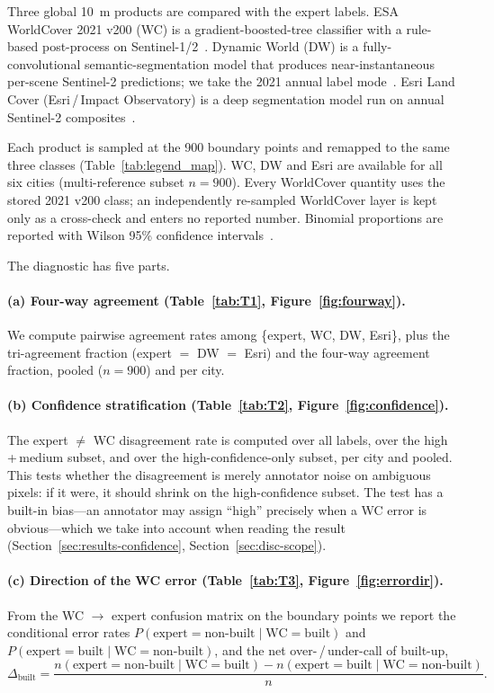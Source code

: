 Three global 10~m products are compared with the expert labels. ESA WorldCover
2021 v200 (WC) is a gradient-boosted-tree classifier with a rule-based
post-process on Sentinel-1/2~\citep{zanaga2022}. Dynamic World (DW) is a
fully-convolutional semantic-segmentation model that produces
near-instantaneous per-scene Sentinel-2 predictions; we take the 2021 annual
label mode~\citep{brown2022}. Esri Land Cover (Esri\,/\,Impact Observatory) is a
deep segmentation model run on annual Sentinel-2 composites~\citep{karra2021}.

Each product is sampled at the 900 boundary points and remapped to the same
three classes (Table~\ref{tab:legend_map}). WC, DW and Esri are available for
all six cities (multi-reference subset $n = 900$). Every WorldCover quantity
uses the stored 2021 v200 class; an independently re-sampled WorldCover layer is
kept only as a cross-check and enters no reported number. Binomial proportions
are reported with Wilson 95\% confidence intervals~\citep{wilson1927}.

The diagnostic has five parts.

\paragraph{(a) Four-way agreement (Table~\ref{tab:T1}, Figure~\ref{fig:fourway}).}
We compute pairwise agreement rates among \{expert, WC, DW, Esri\}, plus the
tri-agreement fraction (expert $=$ DW $=$ Esri) and the four-way agreement
fraction, pooled ($n = 900$) and per city.

\paragraph{(b) Confidence stratification (Table~\ref{tab:T2}, Figure~\ref{fig:confidence}).}
The expert $\neq$ WC disagreement rate is computed over all labels, over the
high\,+\,medium subset, and over the high-confidence-only subset, per city and
pooled. This tests whether the disagreement is merely annotator noise on
ambiguous pixels: if it were, it should shrink on the high-confidence subset.
The test has a built-in bias---an annotator may assign ``high'' precisely when a
WC error is obvious---which we take into account when reading the result
(Section~\ref{sec:results-confidence}, Section~\ref{sec:disc-scope}).

\paragraph{(c) Direction of the WC error (Table~\ref{tab:T3}, Figure~\ref{fig:errordir}).}
From the WC $\to$ expert confusion matrix on the boundary points we report the
conditional error rates $P(\text{expert} = \text{non-built} \mid \text{WC} =
\text{built})$ and $P(\text{expert} = \text{built} \mid \text{WC} =
\text{non-built})$, and the net over-\,/\,under-call of built-up,
%
\begin{equation}\label{eq:netbuilt}
\Delta_{\text{built}} = \frac{n(\text{expert} = \text{non-built} \mid \text{WC} = \text{built})
- n(\text{expert} = \text{built} \mid \text{WC} = \text{non-built})}{n}.
\end{equation}

